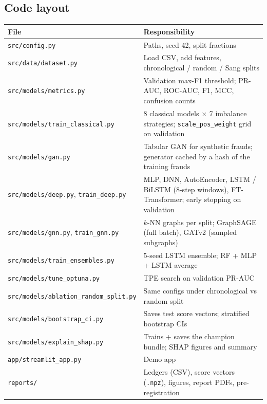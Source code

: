 \documentclass[11pt,a4paper]{article}
\begin{document}
\subsection{Code layout}
{\footnotesize
\begin{center}
\begin{tabular}{@{}lP{10.0cm}@{}}
\toprule
File & Responsibility \\
\midrule
\texttt{src/config.py} & Paths, seed 42, split fractions \\
\texttt{src/data/dataset.py} & Load CSV, add features, chronological / random / Sang splits \\
\texttt{src/models/metrics.py} & Validation max-F1 threshold; PR-AUC, ROC-AUC, F1, MCC, confusion counts \\
\texttt{src/models/train\_classical.py} & 8 classical models $\times$ 7 imbalance strategies; \texttt{scale\_pos\_weight} grid on validation \\
\texttt{src/models/gan.py} & Tabular GAN for synthetic frauds; generator cached by a hash of the training frauds \\
\texttt{src/models/deep.py}, \texttt{train\_deep.py} & MLP, DNN, AutoEncoder, LSTM / BiLSTM (8-step windows), FT-Transformer; early stopping on validation \\
\texttt{src/models/gnn.py}, \texttt{train\_gnn.py} & $k$-NN graphs per split; GraphSAGE (full batch), GATv2 (sampled subgraphs) \\
\texttt{src/models/train\_ensembles.py} & 5-seed LSTM ensemble; RF + MLP + LSTM average \\
\texttt{src/models/tune\_optuna.py} & TPE search on validation PR-AUC \\
\texttt{src/models/ablation\_random\_split.py} & Same configs under chronological vs random split \\
\texttt{src/models/bootstrap\_ci.py} & Saves test score vectors; stratified bootstrap CIs \\
\texttt{src/models/explain\_shap.py} & Trains + saves the champion bundle; SHAP figures and summary \\
\texttt{app/streamlit\_app.py} & Demo app \\
\texttt{reports/} & Ledgers (CSV), score vectors (\texttt{.npz}), figures, report PDFs, pre-registration \\
\bottomrule
\end{tabular}
\end{center}
}

\end{document}
